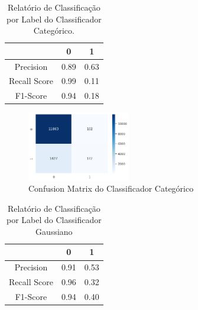 \documentclass[conference]{IEEEtran}
\begin{document}
\begin{table}[H]

	\centering
    \caption{\label{tab:cr3-cnb} Relatório de Classificação por Label do Classificador Categórico.}
    \begin{small}
        \begin{tabular}{ccc}
        
            \hline
                                    & 0                & 1\\
            \hline
            Precision               & 0.89             & 0.63\\
            Recall Score            & 0.99             & 0.11\\
            F1-Score                & 0.94             & 0.18\\
            
            \hline
        \end{tabular}
    \end{small}
\end{table}

\begin{figure}[H]
    \centerline{\includegraphics[width=0.4\textwidth]{IMGS/cm-cnb-numeric.png}}
    
    \caption{\label{fig:cm3-cnb}Confusion Matrix do Classificador Categórico}
\end{figure}


\begin{table}[H]

	\centering
    \caption{\label{tab:cr3-gnb} Relatório de Classificação por Label do Classificador Gaussiano}
    \begin{small}
        \begin{tabular}{ccc}
        
            \hline
                                    & 0                & 1\\
            \hline
            Precision               & 0.91             & 0.53\\
            Recall Score            & 0.96             & 0.32\\
            F1-Score                & 0.94             & 0.40\\
            
            \hline
        \end{tabular}
    \end{small}

\end{table}
\end{document}
